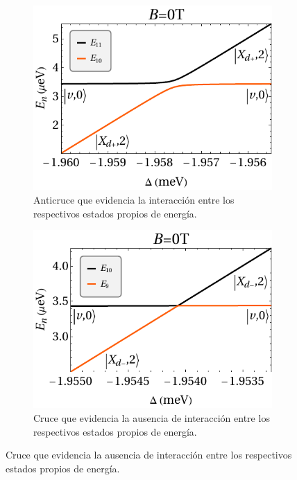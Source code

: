 \documentclass[main.tex]{subfiles}
\begin{document}
\begin{figure}[htbp]
	\centering
	\begin{subfigure}[b]{0.49\textwidth}
		\centering
		\includegraphics[width=\textwidth]{res/E11E10_B0}
		\caption{Anticruce que evidencia la interacción entre los respectivos estados propios de energía.}
		\label{fig:E11E10_B0}
	\end{subfigure}
	\hfill
	\begin{subfigure}[b]{0.49\textwidth}
		\centering
		\includegraphics[width=\textwidth]{res/E10E9_B0}
		\caption{Cruce que evidencia la ausencia de interacción entre los respectivos estados propios de energía.}
		\label{fig:E10E9_B0}
	\end{subfigure}

\end{figure}
\end{document}
